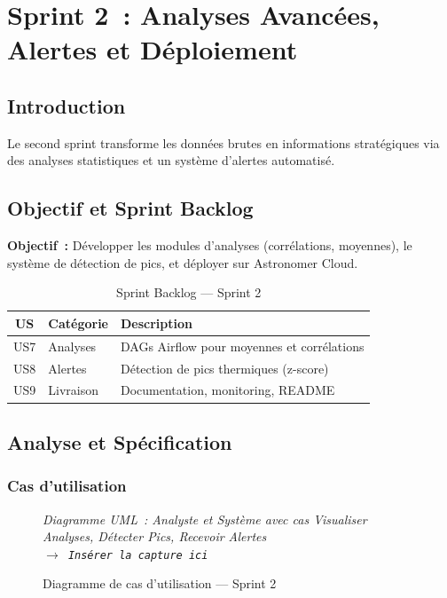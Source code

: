 \documentclass[a4paper,12pt,oneside]{report}
\newcommand{\imgplaceholder}[2]{%
  \begin{tcolorbox}[colback=blue!5,colframe=blue!40,title=#1]
    \centering\itshape #2\\[6pt]
    \texttt{$\rightarrow$ Insérer la capture ici}
  \end{tcolorbox}
}
\begin{document}
\chapter{Sprint 2~: Analyses Avancées, Alertes et Déploiement}

\section{Introduction}
Le second sprint transforme les données brutes en informations stratégiques via des analyses statistiques et un système d'alertes automatisé.

\section{Objectif et Sprint Backlog}
\textbf{Objectif~:} Développer les modules d'analyses (corrélations, moyennes), le système de détection de pics, et déployer sur Astronomer Cloud.

\begin{table}[H]\centering\caption{Sprint Backlog — Sprint 2}\label{tab:sprint2_backlog}
\begin{tabularx}{\textwidth}{clX}\toprule
\textbf{US} & \textbf{Catégorie} & \textbf{Description} \\\midrule
US7 & Analyses & DAGs Airflow pour moyennes et corrélations \\
US8 & Alertes & Détection de pics thermiques (z-score) \\
US9 & Livraison & Documentation, monitoring, README \\\bottomrule
\end{tabularx}\end{table}

\section{Analyse et Spécification}

\subsection{Cas d'utilisation}
\begin{figure}[H]\centering
\imgplaceholder{Figure — Cas d'utilisation Sprint 2}{Diagramme UML~: Analyste et Système avec cas Visualiser Analyses, Détecter Pics, Recevoir Alertes}
\caption{Diagramme de cas d'utilisation — Sprint 2}\label{fig:uc_sprint2}\end{figure}
\end{document}
